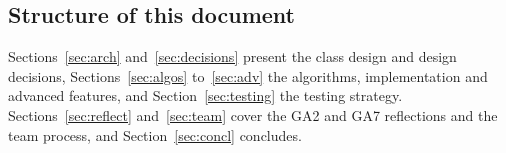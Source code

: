 \subsection{Structure of this document}
Sections~\ref{sec:arch} and~\ref{sec:decisions} present the class design and design decisions, Sections~\ref{sec:algos} to~\ref{sec:adv} the algorithms, implementation and advanced features, and Section~\ref{sec:testing} the testing strategy. Sections~\ref{sec:reflect} and~\ref{sec:team} cover the GA2 and GA7 reflections and the team process, and Section~\ref{sec:concl} concludes.
